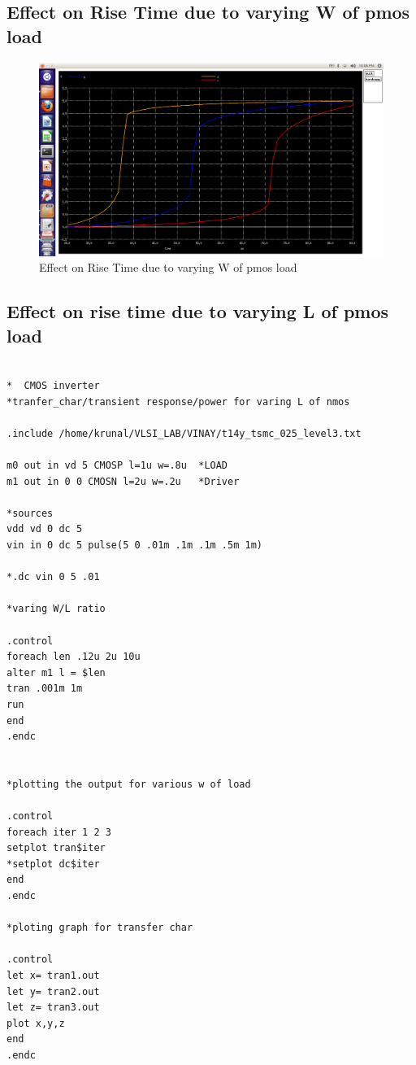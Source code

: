 \documentclass[12pt,a4paper]{article}
\begin{document}
\begin{center}
\subsection{Effect on Rise Time due to varying W of pmos load}
\begin{figure}[!ht]
 \centering
 \includegraphics[scale=0.34]{lab5_4_pic6.png}
 \caption[Short]{Effect on Rise Time due to varying W of pmos load}
 \end{figure}
 \clearpage
 
 
 \subsection{Effect on rise time due to varying L of pmos load}
  \begin{lstlisting}

*  CMOS inverter 
*tranfer_char/transient response/power for varing L of nmos 

.include /home/krunal/VLSI_LAB/VINAY/t14y_tsmc_025_level3.txt

m0 out in vd 5 CMOSP l=1u w=.8u  *LOAD 
m1 out in 0 0 CMOSN l=2u w=.2u	 *Driver

*sources
vdd vd 0 dc 5
vin in 0 dc 5 pulse(5 0 .01m .1m .1m .5m 1m)

*.dc vin 0 5 .01

*varing W/L ratio

.control
foreach len .12u 2u 10u
alter m1 l = $len
tran .001m 1m
run
end
.endc


*plotting the output for various w of load

.control
foreach iter 1 2 3
setplot tran$iter
*setplot dc$iter
end
.endc

*ploting graph for transfer char

.control
let x= tran1.out
let y= tran2.out
let z= tran3.out
plot x,y,z
end
.endc


\end{lstlisting}
\end{center}
\end{document}
